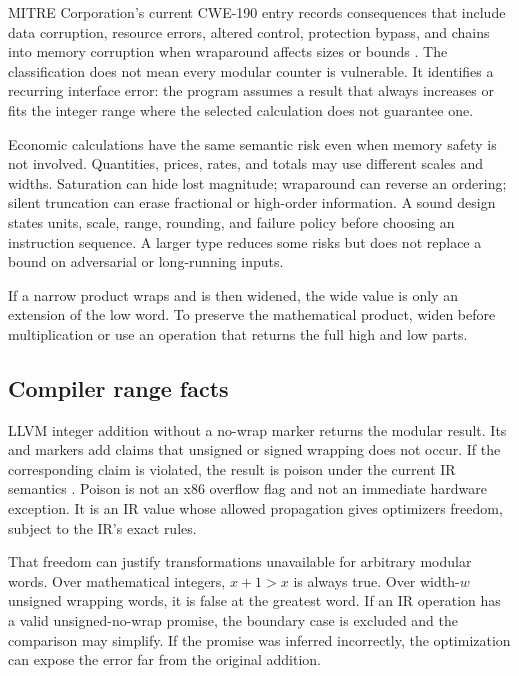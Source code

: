 MITRE Corporation's current CWE-190 entry records consequences that include data
corruption, resource errors, altered control, protection bypass, and chains
into memory corruption when wraparound affects sizes or bounds
\autocite{mitre2026cwe190}. The classification does not mean every modular
counter is vulnerable. It identifies a recurring interface error: the program
assumes a result that always increases or fits the integer range where the selected
calculation does not guarantee one.

Economic calculations have the same semantic risk even when memory safety is
not involved. Quantities, prices, rates, and totals may use different scales
and widths. Saturation can hide lost magnitude; wraparound can reverse an
ordering; silent truncation can erase fractional or high-order information.
A sound design states units, scale, range, rounding, and failure policy before
choosing an instruction sequence. A larger type reduces some risks but does
not replace a bound on adversarial or long-running inputs.

\begin{warning}[title={A later wide cast cannot restore an earlier lost high part}]
If a narrow product wraps and is then widened, the wide value is only an
extension of the low word. To preserve the mathematical product, widen before
multiplication or use an operation that returns the full high and low parts.
\end{warning}

\subsection{Compiler range facts}

LLVM integer addition without a no-wrap marker returns the modular result. Its
 and  markers add claims that unsigned or signed wrapping
does not occur. If the corresponding claim is violated, the result is poison
under the current IR semantics \autocite{llvm2026langref}. Poison is not an
x86 overflow flag and not an immediate hardware exception. It is an IR value
whose allowed propagation gives optimizers freedom, subject to the IR's exact
rules.

That freedom can justify transformations unavailable for arbitrary modular
words. Over mathematical integers, \(x+1>x\) is always true. Over width-\(w\)
unsigned wrapping words, it is false at the greatest word. If an IR operation
has a valid unsigned-no-wrap promise, the boundary case is excluded and the
comparison may simplify. If the promise was inferred incorrectly, the
optimization can expose the error far from the original addition.

